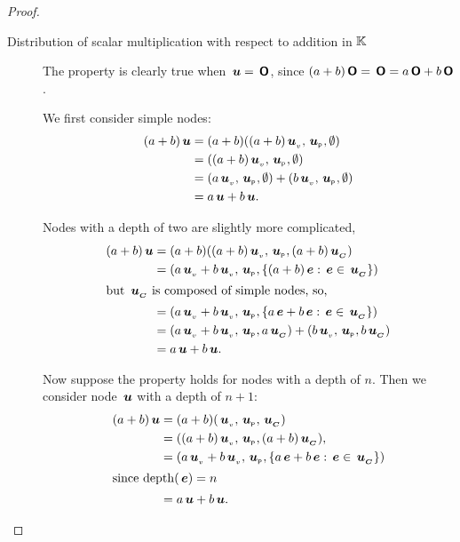 \begin{proposition}
\begin{proof}
\begin{description}
    \item[Distribution of scalar multiplication with respect to
      addition in $\FIELD$ ]\label{distribution}

      The property is clearly true when \(\node{u} = \zerotree\),
      since \((a+b)\zerotree = \zerotree = a\zerotree+b\zerotree\).

      We first consider simple nodes:
      \begin{align*}
        (a + b)\node{u} &= (a + b) ((a + b)\nv{u}, \nlabel{u}, \emptyset) \\
        &= ((a + b)\nv{u}, \nlabel{u}, \emptyset) \\
        &= (a\nv{u}, \nlabel{u}, \emptyset) + (b  \nv{u}, \nlabel{u}, \emptyset) \\
        &= a \node{u} + b \node{u}.
      \end{align*}

      Nodes with a depth of two are slightly more complicated, 
      \begin{align*}
          (a + b)\node{u} &= (a + b) ((a + b)\nv{u}, \nlabel{u}, (a + b)\child{u}) \\
          &= (a\nv{u} + b  \nv{u}, \nlabel{u}, \{(a + b)\node{e}:\node{e}\in\child{u}\}) \\
          \intertext{but \(\child{u}\) is composed of simple nodes, so,}
          &= (a\nv{u} + b  \nv{u}, \nlabel{u}, \{a \node{e} + b \node{e}:\node{e}\in\child{u}\}) \\
          &= (a\nv{u} + b  \nv{u}, \nlabel{u}, a\child{u}) + (b  \nv{u}, \nlabel{u}, b\child{u}) \\
          &= a \node{u} + b \node{u}.
      \end{align*}

      
      Now suppose the property holds for nodes with a depth of \(n\).
      Then we consider node \(\node{u}\) with a depth of \(n+1\):
      \begin{align*}
          (a + b)\node{u} &= (a + b) (\nv{u}, \nlabel{u}, \child{u}) \\
          &= ((a + b)\nv{u}, \nlabel{u}, (a + b)\child{u}), \\
          &= (a\nv{u} + b  \nv{u}, \nlabel{u}, \{a \node{e} + b \node{e}:\node{e}\in\child{u}\}) \\
        \intertext{since \(\depth(\node{e}) = n\)}
          &= a \node{u} + b \node{u}.
      \end{align*}


\end{description}
\end{proof}
\end{proposition}
